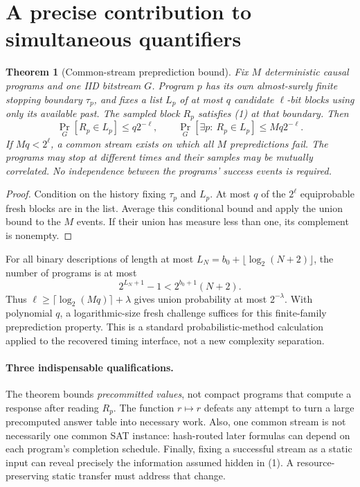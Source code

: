 \documentclass[11pt]{article}
\newtheorem{theorem}{Theorem}
\begin{document}
\section{A precise contribution to simultaneous quantifiers}
\begin{theorem}[Common-stream preprediction bound]\label{thm:union}
Fix $M$ deterministic causal programs and one IID bitstream $G$. Program $p$
has its own almost-surely finite stopping boundary $\tau_p$, and fixes a list
$L_p$ of at most $q$ candidate $\ell$-bit blocks using only its available past.
The sampled block $R_p$ satisfies (1) at that boundary. Then
\[
 \Pr_G[R_p\in L_p]\le q2^{-\ell},\qquad
 \Pr_G[\exists p:\ R_p\in L_p]\le Mq2^{-\ell}.            \tag{5}
\]
If $Mq<2^\ell$, a common stream exists on which all $M$ prepredictions fail.
The programs may stop at different times and their samples may be mutually
correlated. No independence between the programs' success events is required.
\end{theorem}
\begin{proof}
Condition on the history fixing $\tau_p$ and $L_p$. At most $q$ of the
$2^\ell$ equiprobable fresh blocks are in the list. Average this conditional
bound and apply the union bound to the $M$ events. If their union has measure
less than one, its complement is nonempty.
\end{proof}

For all binary descriptions of length at most
$L_N=b_0+\lfloor\log_2(N+2)\rfloor$, the number of programs is at most
\[
 2^{L_N+1}-1<2^{b_0+1}(N+2).
\]
Thus $\ell\ge\lceil\log_2(Mq)\rceil+\lambda$ gives union probability at most
$2^{-\lambda}$. With polynomial $q$, a logarithmic-size fresh challenge
suffices for this finite-family preprediction property. This is a standard
probabilistic-method calculation applied to the recovered timing interface,
not a new complexity separation.

\paragraph{Three indispensable qualifications.}
The theorem bounds \emph{precommitted values}, not compact programs that compute
a response after reading $R_p$. The function $r\mapsto r$ defeats any attempt
to turn a large precomputed answer table into necessary work. Also, one common
stream is not necessarily one common SAT instance: hash-routed later formulas
can depend on each program's completion schedule. Finally, fixing a successful
stream as a static input can reveal precisely the information assumed hidden
in (1). A resource-preserving static transfer must address that change.
\end{document}
